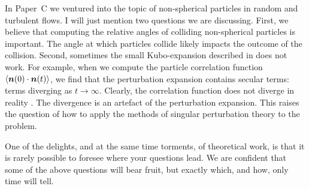 \documentclass[thesis.tex]{subfiles}
\begin{document}
In Paper~C we ventured into the topic of non-spherical particles in random and turbulent flows. I will just mention two questions we are discussing. First, we believe that computing the relative angles of colliding non-spherical particles is important. The angle at which particles collide likely impacts the outcome of the collision. Second, sometimes the small Kubo-expansion described in  does not work. For example, when we compute the particle correlation function $\langle \mbox{\boldmath$n$}(0)\cdot\mbox{\boldmath$n$}(t)\rangle$, we find that the perturbation expansion contains secular terms: terms diverging as $t\to\infty$. Clearly, the correlation function does not diverge in reality \cite{pumir2011}. The divergence is an artefact of the perturbation expansion. This raises the question of how to apply the methods of singular perturbation theory to the problem.

One of the delights, and at the same time torments, of theoretical work, is that it is rarely possible to foresee where your questions lead. We are confident that some of the above questions will bear fruit, but exactly which, and how, only time will tell.
\end{document}
